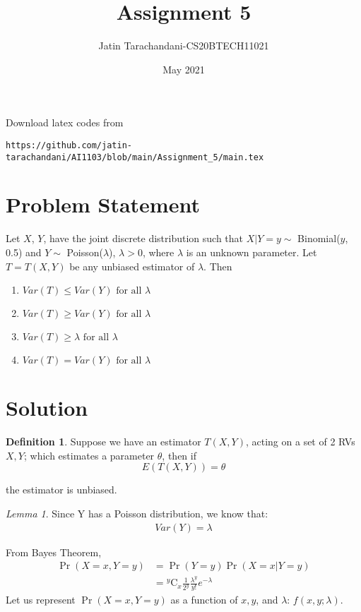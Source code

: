 \documentclass[twocolumn]{article}
\title{Assignment 5}
\author{Jatin Tarachandani-CS20BTECH11021}
\date{May 2021}
\newcommand{\comb}[2]{{}^{#1}\mathrm{C}_{#2}}
\providecommand{\pr}[1]{\ensuremath{\Pr\left(#1\right)}}
\providecommand{\brak}[1]{\ensuremath{\left(#1\right)}}
\theoremstyle{remark}
\newtheorem{lemma}[theorem]{Lemma}
\theoremstyle{definition}
\newtheorem{definition}{Definition}[section]
\numberwithin{equation}{subsection}
\begin{document}
\maketitle
Download latex codes from 
%
\begin{lstlisting}
https://github.com/jatin-tarachandani/AI1103/blob/main/Assignment_5/main.tex
\end{lstlisting}
\section{Problem Statement}
Let $X$, $Y$, have the joint discrete distribution such that $X|Y=y \sim$ Binomial($y$, 0.5) and $Y\sim$ Poisson($\lambda$), $\lambda>0$, where $\lambda$ is an unknown parameter. Let $T=T(X, Y)$ be any unbiased estimator of $\lambda$. Then
\begin{enumerate}
    \item  $Var(T) \leq Var(Y)  \text{ for all } \lambda$
    \item $Var(T) \geq Var(Y) \text{ for all } \lambda$
    \item $Var(T) \geq \lambda \text{ for all } \lambda$
    \item $Var(T) = Var(Y) \text{ for all } \lambda$
\end{enumerate}

\section{Solution}
\begin{definition}
Suppose we have an estimator $T(X, Y)$, acting on a set of 2 RVs $X, Y$; which estimates a parameter $\theta$, then if
\begin{equation}
    E\brak{T(X, Y)}=\theta
\end{equation}

the estimator is unbiased. 
\end{definition}

\begin{lemma}
Since Y has a Poisson distribution, we know that:
\begin{align}\label{Var=lam}
Var(Y)=\lambda
\end{align}
\end{lemma}

From Bayes Theorem,
\begin{align}
    \pr{X=x,Y=y}&=\pr{Y=y}  \pr{X=x|Y=y}\\
    &= \comb{y}{x} \frac{1}{2^y} \frac{\lambda^y}{y!} e^{- \lambda}
\end{align}
Let us represent $ \pr{X=x,Y=y}$ as a function of $x, y$, and $\lambda$: $f(x, y;\lambda)$.
\end{document}
